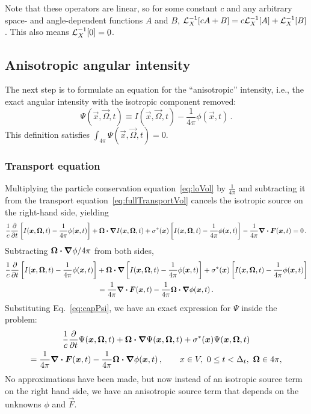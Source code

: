 Note that these operators are linear, so for some constant $c$ and any
arbitrary space- and angle-dependent functions $A$ and $B$, $\mathcal{L}_{X}^{-1}\!\left[ cA +
B\right] = c\mathcal{L}_{X}^{-1}\!\left[ A\right] + \mathcal{L}_{X}^{-1}\!\left[ B\right]$. This also means $\mathcal{L}_{X}^{-1}\!\left[0\right] = 0$.

\subsection{Anisotropic angular intensity}
The next step is to formulate an equation for the ``anisotropic'' intensity,
i.e., the exact angular intensity with the isotropic component removed:
\begin{equation} \label{eq:capPsi}
  \Psi(\vec{x}, \vec{\Omega}, t) \equiv I(\vec{x}, \vec{\Omega}, t)
  - \frac{1}{4\pi} \phi(\vec{x}, t)\,.
\end{equation}
This definition satisfies $\int_{4\pi} \Psi(\vec{x}, \vec{\Omega}, t)=0$.

\subsubsection{Transport equation}
Multiplying the particle conservation equation~\eqref{eq:loVol} by
$\frac{1}{4\pi}$ and subtracting it from the transport
equation~\eqref{eq:fullTransportVol} cancels the isotropic source on the
right-hand side, yielding
\begin{equation*}
  \frac{1}{c} \frac{\partial }{\partial t}\left[ I(\bm{x}, \bm{\Omega}, t)
  - \frac{1}{4\pi} \phi(\bm{x}, t) \right]
    + \bm{\Omega}\bm{\cdot} \bm{\nabla} I(\bm{x}, \bm{\Omega}, t)
    + \sigma^\ast(\bm{x}) \left[ I(\bm{x}, \bm{\Omega}, t)
  - \frac{1}{4\pi} \phi(\bm{x}, t) \right]
  - \frac{1}{4\pi} \bm{\nabla} \bm{\cdot}\bm{F}(\bm{x}, t)
= 0 \,.
\end{equation*}
Subtracting $\bm{\Omega}\bm{\cdot} \bm{\nabla} \phi/4\pi$ from both sides,
\begin{multline*}
  \frac{1}{c} \frac{\partial }{\partial t}\left[ I(\bm{x}, \bm{\Omega}, t)
  - \frac{1}{4\pi} \phi(\bm{x}, t) \right]
    + \bm{\Omega}\bm{\cdot} \bm{\nabla} \left[ I(\bm{x}, \bm{\Omega}, t)
  - \frac{1}{4\pi} \phi(\bm{x}, t) \right]
    + \sigma^\ast(\bm{x}) \left[ I(\bm{x}, \bm{\Omega}, t)
  - \frac{1}{4\pi} \phi(\bm{x}, t) \right]
  \\ = \frac{1}{4\pi} \bm{\nabla} \bm{\cdot}\bm{F}(\bm{x}, t) -
  \frac{1}{4\pi} \bm{\Omega}\bm{\cdot} \bm{\nabla} \phi(\bm{x}, t)\,.
\end{multline*}
Substituting Eq.~\eqref{eq:capPsi}, we have an exact expression for $\Psi$
inside the problem:
\begin{multline} \label{eq:capPsiVol}
  \frac{1}{c} \frac{\partial }{\partial t}\Psi(\bm{x}, \bm{\Omega}, t)
    + \bm{\Omega}\bm{\cdot} \bm{\nabla} \Psi(\bm{x}, \bm{\Omega}, t)
    + \sigma^\ast(\bm{x}) \Psi(\bm{x}, \bm{\Omega}, t)
  \\
  = \frac{1}{4\pi} \bm{\nabla} \bm{\cdot}\bm{F}(\bm{x}, t) -
  \frac{1}{4\pi} \bm{\Omega}\bm{\cdot} \bm{\nabla} \phi(\bm{x}, t)\,,
  \qquad
x \in V,\  0 \le t < \Delta_t, \ \bm{\Omega} \in 4\pi,
\end{multline}
No approximations have been made, but now instead of an isotropic source term
on the right hand side, we have an anisotropic source term that depends on the
unknowns $\phi$ and $\vec{F}$.


